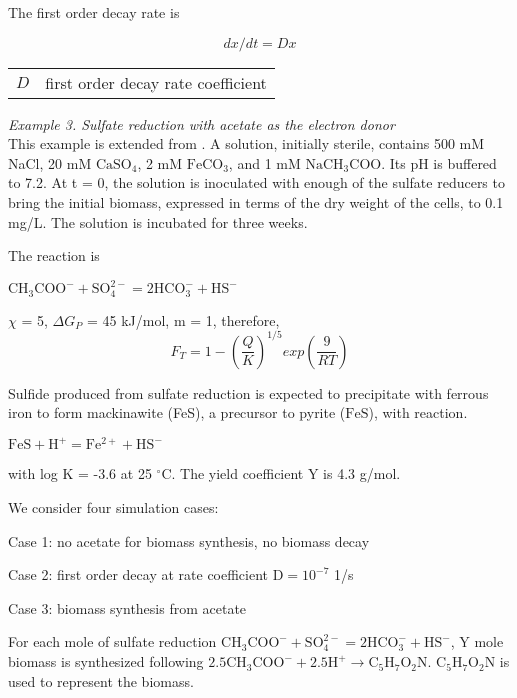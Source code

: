 \documentclass[12pt, a4paper]{article}
\begin{document}
The first order decay rate is

\begin{equation}  
dx/dt = Dx
\end{equation}

\begin{tabular}{ll}
$D$ & first order decay rate coefficient \\
\end{tabular}

\emph{Example 3. Sulfate reduction with acetate as the electron donor} \\
This example is extended from \cite{bethke2007geochemical}. 
A solution, initially sterile, contains 500 mM NaCl, 20 mM $\mathrm{CaSO_4}$, 2 mM $\mathrm{FeCO_3}$, and 1 mM $\mathrm{NaCH_3COO}$. Its pH is buffered to 7.2. At t = 0, the solution is inoculated with enough of the sulfate reducers to bring the initial biomass, expressed in terms of the dry weight of the cells, to 0.1 mg/L. The solution is incubated for three weeks.

The reaction is 

\begin{center}
$\mathrm{CH_3COO^- + SO_4^{2-} = 2 HCO_3^- + HS^-}$
\end{center}

$\chi$ = 5, $\Delta G_P$ = 45 kJ/mol, m = 1, therefore, 
\begin{equation}  
F_T = 1 -\left(\frac{Q}{K}\right)^{1/5} exp\left(\frac{9}{RT}\right)
\end{equation}
 
Sulfide produced from sulfate reduction is expected to precipitate with ferrous iron to form mackinawite (FeS), a precursor to pyrite ($\mathrm{FeS}$), with reaction.

\begin{center}
$\mathrm{FeS + H^+ = Fe^{2+} + HS^{-}}$
\end{center}

with log K = -3.6 at 25 $^\circ$C. The yield coefficient Y is 4.3 g/mol.

We consider four simulation cases:

Case 1: no acetate for biomass synthesis, no biomass decay

Case 2: first order decay at rate coefficient $\mathrm{D = 10^{-7}}$ 1/s 

Case 3: biomass synthesis from acetate

For each mole of sulfate reduction $\mathrm{CH_3COO^- + SO_4^{2-} = 2 HCO_3^- + HS^-}$, Y mole biomass is synthesized following $\mathrm{2.5 CH_3COO^- + 2.5 H^+ \rightarrow C_5H_7O_2N}$. $\mathrm{C_5H_7O_2N}$ is used to represent the biomass.
\end{document}
